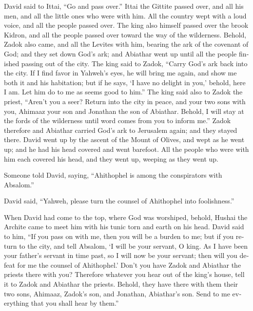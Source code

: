 \begin{paracol}{2}
\begin{otherlanguage}{english}
 David said to Ittai, ``Go and pass over.'' Ittai the
Gittite passed over, and all his men, and all the little ones who were
with him.  All the country wept with a loud voice, and
all the people passed over. The king also himself passed over the brook
Kidron, and all the people passed over toward the way of the wilderness.
 Behold, Zadok also came, and all the Levites with him,
bearing the ark of the covenant of God; and they set down God's ark; and
Abiathar went up until all the people finished passing out of the city.
 The king said to Zadok, ``Carry God's ark back into the
city. If I find favor in Yahweh's eyes, he will bring me again, and show
me both it and his habitation;  but if he says, `I have
no delight in you,' behold, here I am. Let him do to me as seems good to
him.''  The king said also to Zadok the priest, ``Aren't
you a seer? Return into the city in peace, and your two sons with you,
Ahimaaz your son and Jonathan the son of Abiathar. 
Behold, I will stay at the fords of the wilderness until word comes from
you to inform me.''  Zadok therefore and Abiathar carried
God's ark to Jerusalem again; and they stayed there. 
David went up by the ascent of the Mount of Olives, and wept as he went
up; and he had his head covered and went barefoot. All the people who
were with him each covered his head, and they went up, weeping as they
went up.

 Someone told David, saying, ``Ahithophel is among the
conspirators with Absalom.''

David said, ``Yahweh, please turn the counsel of Ahithophel into
foolishness.''

 When David had come to the top, where God was worshiped,
behold, Hushai the Archite came to meet him with his tunic torn and
earth on his head.  David said to him, ``If you pass on
with me, then you will be a burden to me;  but if you
return to the city, and tell Absalom, `I will be your servant, O king.
As I have been your father's servant in time past, so I will now be your
servant; then will you defeat for me the counsel of Ahithophel.'
 Don't you have Zadok and Abiathar the priests there with
you? Therefore whatever you hear out of the king's house, tell it to
Zadok and Abiathar the priests.  Behold, they have there
with them their two sons, Ahimaaz, Zadok's son, and Jonathan, Abiathar's
son. Send to me everything that you shall hear by them.''


\end{otherlanguage}
\end{paracol}
